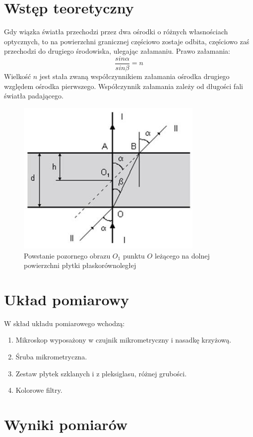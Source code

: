 \documentclass{article}
\begin{document}
\section{Wstęp teoretyczny}
Gdy wiązka światła przechodzi przez dwa ośrodki o różnych własnościach optycznych, to na powierzchni granicznej częściowo zostaje odbita, częściowo zaś przechodzi do drugiego środowiska, ulegając załamaniu.
Prawo załamania:
$$\frac{sin \alpha}{sin \beta} = n$$ 
Wielkość $n$ jest stała zwaną współczynnikiem załamania ośrodka drugiego względem ośrodka pierwszego. Współczynnik załamania zależy od długości fali światła padającego. 
\begin{figure}[!htb]
	\centering
	\includegraphics[width=90mm]{image006.jpg}
	\caption{Powstanie pozornego obrazu $O_{1}$ punktu $O$ leżącego na dolnej  powierzchni płytki płaskorównoległej }
\end{figure}

\clearpage
\section{Układ pomiarowy}
W skład układu pomiarowego wchodzą: 
\begin{enumerate}
\item Mikroskop wyposażony w czujnik mikrometryczny i nasadkę krzyżową.
\item Śruba mikrometryczna. 
\item Zestaw płytek szklanych i z pleksiglasu, różnej grubości.
\item Kolorowe filtry.
\end{enumerate}
\section{Wyniki pomiarów}
\end{document}
